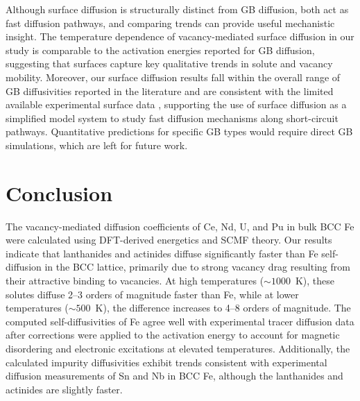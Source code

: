 \documentclass[preprint,12pt]{elsarticle}
\begin{document}
Although surface diffusion is structurally distinct from GB diffusion, both act as fast diffusion pathways, and comparing trends can provide useful mechanistic insight. The temperature dependence of vacancy-mediated surface diffusion in our study is comparable to the activation energies reported for GB diffusion, suggesting that surfaces capture key qualitative trends in solute and vacancy mobility. Moreover, our surface diffusion results fall within the overall range of GB diffusivities reported in the literature and are consistent with the limited available experimental surface data \cite{taylor2024directly}, supporting the use of surface diffusion as a simplified model system to study fast diffusion mechanisms along short-circuit pathways. Quantitative predictions for specific GB types would require direct GB simulations, which are left for future work.




\FloatBarrier

\section{Conclusion}
\noindent The vacancy-mediated diffusion coefficients of Ce, Nd, U, and Pu in bulk BCC Fe were calculated using DFT-derived energetics and SCMF theory. Our results indicate that lanthanides and actinides diffuse significantly faster than Fe self-diffusion in the BCC lattice, primarily due to strong vacancy drag resulting from their attractive binding to vacancies. At high temperatures ($\sim1000$~K), these solutes diffuse 2–3 orders of magnitude faster than Fe, while at lower temperatures ($\sim500$~K), the difference increases to 4–8 orders of magnitude.
The computed self-diffusivities of Fe agree well with experimental tracer diffusion data after corrections were applied to the activation energy to account for magnetic disordering and electronic excitations at elevated temperatures. Additionally, the calculated impurity diffusivities exhibit trends consistent with experimental diffusion measurements of Sn and Nb in BCC Fe, although the lanthanides and actinides are slightly faster.
\end{document}
